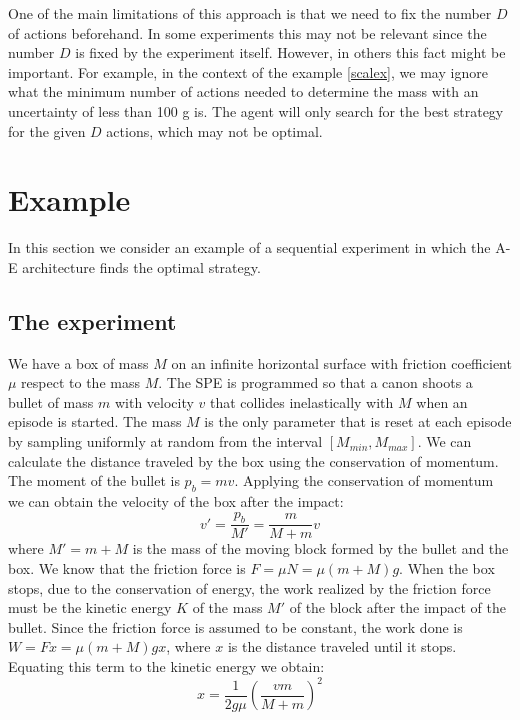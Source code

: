 \documentclass[11pt,a4paper,twoside]{report}
\newcommand{\+}{\textnormal{+} }
\theoremstyle{definition}
\numberwithin{equation}{chapter}
\begin{document}
One of the main limitations of this approach is that we need to fix the number
$D$ of actions beforehand. In some experiments this may not be relevant since
the number $D$ is fixed by the experiment itself. However, in others this fact
might be important. For example, in the context of the example \ref{scalex}, we
may ignore what the minimum number of actions needed to determine the mass
with an uncertainty of less than 100 g is. The agent will only search for the best
strategy for the given $D$ actions, which may not be optimal.


\section{Example}

In this section we consider an example of a sequential experiment
in which the A-E architecture finds the optimal strategy.

\subsection{The experiment}

We have a box of mass $M$ on an infinite horizontal surface with friction
coefficient $\mu$ respect to the mass $M$. The SPE is programmed so that a canon
shoots a bullet of mass $m$ with velocity $v$ that collides inelastically with
$M$ when an episode is started. The mass $M$ is the only parameter that is reset
at each episode by sampling uniformly at random from the interval $[M_{min},
M_{max}]$. We can calculate the distance traveled by the box using the
conservation of momentum. The moment of the bullet is $p_b=mv$. Applying the
conservation of momentum we can obtain the velocity of the box after the impact:
\begin{equation}
  v' = \frac{p_b}{M'}=\frac{m}{M+m}v
\end{equation}
where $M'=m+M$ is the mass of the moving block formed by the bullet and the box.
 We know that the friction force is $F=\mu N=\mu (m+M)g$. When the box stops,
 due to the conservation of energy, the work realized by the friction force must
 be the kinetic energy $K$ of the mass $M'$ of the block after the impact of the
 bullet. Since the friction force is assumed to be constant, the work done is
 $W=Fx=\mu (m+M)gx$, where $x$ is the distance traveled until it stops. Equating
 this term to the kinetic energy we obtain:
\begin{equation}
  \label{displacement} 
  x=\frac{1}{2g\mu}\left(\frac{vm}{M+m} \right)^2
\end{equation}
\end{document}
